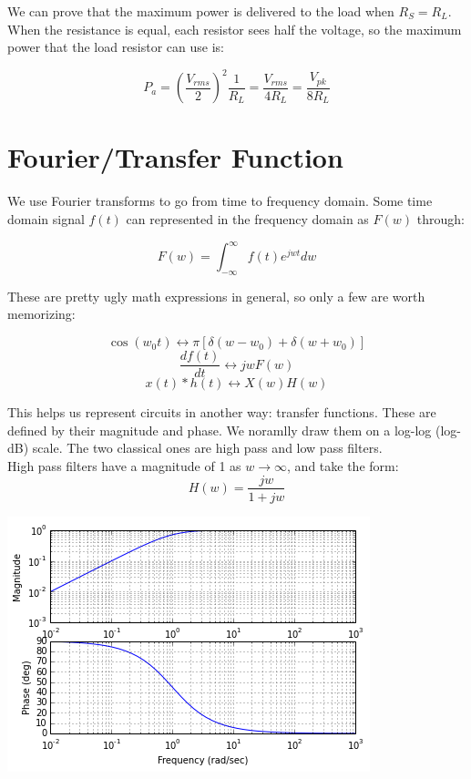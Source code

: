 \documentclass[12pt]{article}
\begin{document}
We can prove that the maximum power is delivered to the load when $R_S = R_L$. When the resistance is equal, each resistor sees half the voltage, so the maximum power that the load resistor can use is:

\[P_a = \left(\dfrac{V_{rms}}{2}\right)^2 \dfrac{1}{R_L} = \dfrac{V_{rms}}{4R_L} = \dfrac{V_{pk}}{8R_L} \]

\section*{Fourier/Transfer Function}

We use Fourier transforms to go from time to frequency domain. Some time domain signal $f(t)$ can represented in the frequency domain as $F(w)$ through:

\[ F(w) = \int_{-\infty}^{\infty} f(t)e^{jwt}dw \]

These are pretty ugly math expressions in general, so only a few are worth memorizing:

\[ \cos(w_0t) \leftrightarrow \pi[\delta(w-w_0) + \delta(w+w_0)]\] 
\[ \dfrac{df(t)}{dt} \leftrightarrow  jwF(w)\]
\[ x(t)*h(t) \leftrightarrow X(w)H(w) \]

This helps us represent circuits in another way: transfer functions. These are defined by their magnitude and phase. We noramlly draw them on a log-log (log-dB) scale. The two classical ones are high pass and low pass filters.  \\

High pass filters have a magnitude of 1 as $w\rightarrow\infty$, and take the form:
\[H(w) = \dfrac{jw}{1+jw}\]
\begin{center}
	\includegraphics[scale=0.75]{assets/ece210-hpf.png}
\end{center}
\end{document}
